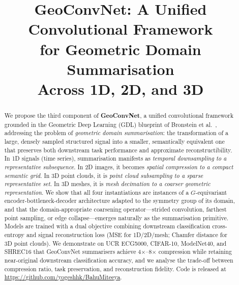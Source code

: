 \documentclass[10pt,conference]{IEEEtran}
\begin{document}
\title{GeoConvNet: A Unified Convolutional Framework\\
       for Geometric Domain Summarisation\\
       Across 1D, 2D, and 3D}

\author{%
}

\maketitle

\begin{abstract}
We propose the third component of \textbf{GeoConvNet}, a unified
convolutional framework grounded in the Geometric Deep Learning (GDL)
blueprint of Bronstein et al.~\cite{bronstein2021geometric}, addressing
the problem of \emph{geometric domain summarisation}: the transformation
of a large, densely sampled structured signal into a smaller, semantically
equivalent one that preserves both downstream task performance and
approximate reconstructibility.  In 1D signals (time series), summarisation
manifests as \emph{temporal downsampling to a representative subsequence}.
In 2D images, it becomes \emph{spatial compression to a compact semantic
grid}.  In 3D point clouds, it is \emph{point cloud subsampling to a sparse
representative set}.  In 3D meshes, it is \emph{mesh decimation to a
coarser geometric representation}.  We show that all four instantiations
are instances of a $G$-equivariant encoder-bottleneck-decoder architecture
adapted to the symmetry group of its domain, and that the domain-appropriate
coarsening operator---strided convolution, farthest point sampling, or
edge collapse---emerges naturally as the summarisation primitive.  Models
are trained with a dual objective combining downstream classification
cross-entropy and signal reconstruction loss (MSE for 1D/2D/mesh; Chamfer
distance for 3D point clouds).  We demonstrate on UCR ECG5000, CIFAR-10,
ModelNet40, and SHREC16 that GeoConvNet summarisers achieve 4$\times$--8$\times$
compression while retaining near-original downstream classification accuracy,
and we analyse the trade-off between compression ratio, task preservation,
and reconstruction fidelity.  Code is released at
\url{https://github.com/yogeshhk/BahuMiteeya}.
\end{abstract}
\end{document}
